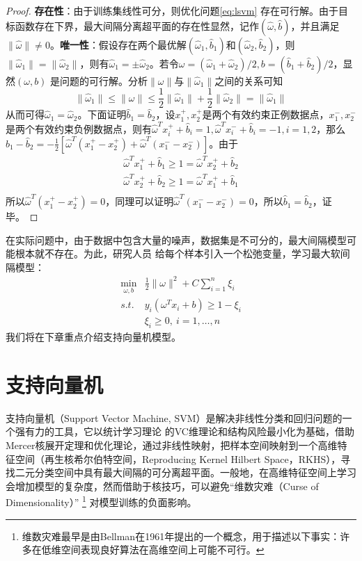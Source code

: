 \begin{proof}
\textbf{存在性}：由于训练集线性可分，则优化问题\eqref{eq:lsvm} 存在可行解。由于目标函数存在下界，最大间隔分离超平面的存在性显然，记作$(\hat \omega,\hat b)$，并且满足$\|\hat\omega\|\ne 0$。\textbf{唯一性}：假设存在两个最优解$(\hat\omega_1,\hat b_1)$和$(\hat\omega_2,\hat b_2)$，则$\|\hat\omega_1\|=\|\hat\omega_2\|$，则有$\hat\omega_1=\pm \hat\omega_2$。若令$\omega=(\hat\omega_1 + \hat\omega_2)/2, b = (\hat b_1+\hat b_2)/2$，显然$(\omega,b)$ 是问题的可行解。分析$\|\omega\|$与$\|\hat\omega_1\|$之间的关系可知
\[
    \|\hat\omega_1\| \le \|\omega\| \le \frac{1}{2} \|\hat\omega_1\| + \frac{1}{2}\|\hat\omega_2\| = \|\hat\omega_1\|
\]
从而可得$\hat\omega_1= \hat\omega_2$。下面证明$\hat b_1=\hat b_2$，设$x_1^{+},x_2^{+}$是两个有效约束正例数据点，$x_1^{-},x_2^{-}$ 是两个有效约束负例数据点，则有$\hat\omega^T x_i^{+} + \hat b_i=1,\hat\omega^T x_i^{-} + \hat b_i=-1,i=1,2$，那么$\hat b_1-\hat b_2=-\frac{1}{2} [\hat\omega^T (x_1^{+}-x_2^{+}) + \hat\omega^T (x_1^{-}-x_2^{-})]$。由于
\begin{eqnarray}
  \nonumber \hat\omega^T x_1^{+} + \hat b_1 \ge 1 = \hat\omega^T x_2^{+} + \hat b_2 \\
  \nonumber \hat\omega^T x_2^{+} + \hat b_2 \ge 1 = \hat\omega^T x_1^{+} + \hat b_1 \\
\end{eqnarray}
所以$\hat\omega^T (x_1^{+}-x_2^{+})=0$，同理可以证明$\hat\omega^T (x_1^{-}-x_2^{-})=0$，所以$\hat b_1=\hat b_2$，证毕。
\end{proof}

在实际问题中，由于数据中包含大量的噪声，数据集是不可分的，最大间隔模型可能根本就不存在。为此，研究人员\cite{bennett1992robust,cortes1995support} 给每个样本引入一个松弛变量，学习最大软间隔模型：
\begin{equation}
    \begin{array}{lll}
      \min\limits_{\omega,b} & \frac{1}{2}\|\omega\|^2 + C\sum\limits_{i=1}^n \xi_i \\
      \textit{s.t.} & y_i(\omega^T x_i + b) \ge 1 - \xi_i \\
                    & \xi_i \ge 0,~i=1,\ldots,n
    \end{array}
\end{equation}
我们将在下章重点介绍支持向量机模型。

\chapter{支持向量机}
支持向量机（Support Vector Machine, SVM）\cite{boser1992training,cortes1995support}是解决非线性分类和回归问题的一个强有力的工具，它以统计学习理论
\cite{vapnik1963pattern,vapnik1998statistical,vapnik1999overview,vapnik2000nature} 的VC维理论和结构风险最小化为基础，借助Mercer核展开定理和优化理论，通过非线性映射，把样本空间映射到一个高维特征空间（再生核希尔伯特空间，Reproducing Kernel Hilbert Space，RKHS），寻找二元分类空间中具有最大间隔的可分离超平面。一般地，在高维特征空间上学习会增加模型的复杂度，然而借助于核技巧，可以避免“维数灾难（Curse of Dimensionality）”
\footnote{维数灾难最早是由Bellman在1961年提出的一个概念，用于描述以下事实：许多在低维空间表现良好算法在高维空间上可能不可行。}
对模型训练的负面影响。

